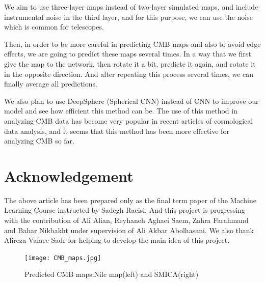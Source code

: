 \documentclass[10pt, english, pra,aps,twocolumn,floatfix,superscriptaddress]{revtex4-2}
\begin{document}
We aim to use three-layer maps instead of two-layer simulated maps, and include instrumental noise in the third layer, and for this purpose, we can use the noise which is common for telescopes.

 Then, in order to be more careful in predicting CMB maps and also to avoid edge effects, we are going to predict these maps several times. In a way that we first give the map to the network, then rotate it a bit, predicte it again, and rotate it in the opposite direction. And after repeating this process several times, we can finally average all predictions.

We also plan to use DeepSphere (Spherical CNN) instead of CNN to improve our model and see how efficient this method can be. The use of this method in analyzing CMB data has become very popular in recent articles of cosmological data analysis, and it seems that this method has been more effective for analyzing CMB so far\cite{DeepSphere}.

\section{Acknowledgement}
The above article has been prepared only as the final term paper of the Machine Learning Course instructed by Sadegh Raeisi. And this project is progressing with the contribution of Ali Alian, Reyhaneh Aghaei Saem, Zahra Farahmand and Bahar Nikbakht under supervision of Ali Akbar Abolhasani. We also thank Alireza Vafaee Sadr for helping to develop the main idea of this project.

 \begin{figure}
    \centering
    \texttt{[image: CMB\_maps.jpg]}
    \caption{Predicted CMB maps:Nilc map(left) and SMICA(right)}
    \label{fig:CMB}
\end{figure}
\nocite{*}
\newpage

\end{document}
